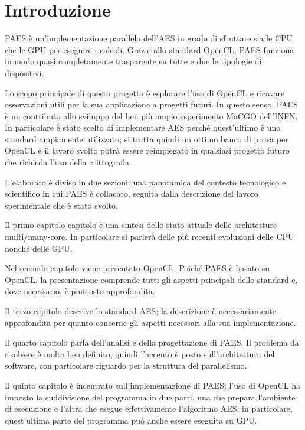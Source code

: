 \documentclass[12pt,a4paper,oneside]{book}
\begin{document}
\tableofcontents

\frontmatter
\chapter{Introduzione}

PAES è un'implementazione parallela dell'\ac{AES} in grado di sfruttare sia le \ac{CPU} che le \ac{GPU} per eseguire i calcoli. Grazie allo standard \ac{OpenCL}, PAES funziona in modo quasi completamente trasparente su tutte e due le tipologie di dispositivi.

Lo scopo principale di questo progetto è esplorare l'uso di \ac{OpenCL} e ricavare osservazioni utili per la sua applicazione a progetti futuri. In questo senso, PAES è un contributo allo sviluppo del ben più ampio esperimento \ac{MaCGO} dell'\ac{INFN}. In particolare è stato scelto di implementare \ac{AES} perché quest'ultimo è uno standard\cite{bib:fips-197} ampiamente utilizzato; si tratta quindi un ottimo banco di prova per \ac{OpenCL} e il lavoro svolto potrà essere reimpiegato in qualsiasi progetto futuro che richieda l'uso della crittografia.

L'elaborato è diviso in due sezioni: una panoramica del contesto tecnologico e scientifico in cui PAES è collocato, seguita dalla descrizione del lavoro sperimentale che è stato svolto.

Il primo capitolo capitolo è una sintesi dello stato attuale delle architetture multi/many-core. In particolare si parlerà delle più recenti evoluzioni delle \ac{CPU} nonché delle \ac{GPU}.

Nel secondo capitolo viene presentato \ac{OpenCL}. Poiché PAES è basato su \ac{OpenCL}, la presentazione comprende tutti gli aspetti principali dello standard e, dove necessario, è piuttosto approfondita.

Il terzo capitolo descrive lo standard \ac{AES}; la descrizione è necessariamente approfondita per quanto concerne gli aspetti necessari alla sua implementazione.

Il quarto capitolo parla dell'analisi e della progettazione di PAES. Il problema da risolvere è molto ben definito, quindi l'accento è posto sull'architettura del software, con particolare riguardo per la struttura del parallelismo.

Il quinto capitolo è incentrato sull'implementazione di PAES; l'uso di \ac{OpenCL} ha imposto la suddivisione del programma in due parti, una che prepara l'ambiente di esecuzione e l'altra che esegue effettivamente l'algoritmo \ac{AES}; in particolare, quest'ultima parte del programma può anche essere eseguita su \ac{GPU}.
\end{document}
